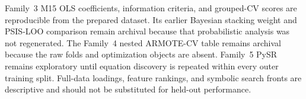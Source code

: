 \documentclass[a4paper,11pt]{article}
\begin{document}
Family~3 M15 OLS coefficients, information criteria, and grouped-CV scores are reproducible from the prepared dataset. Its earlier Bayesian stacking weight and PSIS-LOO comparison remain archival because that probabilistic analysis was not regenerated. The Family~4 nested ARMOTE-CV table remains archival because the raw folds and optimization objects are absent. Family~5 PySR remains exploratory until equation discovery is repeated within every outer training split. Full-data loadings, feature rankings, and symbolic search fronts are descriptive and should not be substituted for held-out performance.



\end{document}
